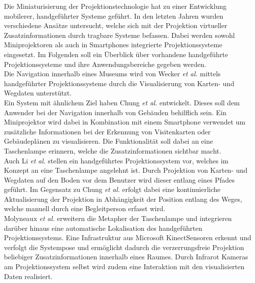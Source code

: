 Die Miniaturisierung der Projektionstechnologie hat zu einer Entwicklung mobilerer, handgeführter Systeme geführt. In den letzten Jahren wurden verschiedene Ansätze untersucht, welche sich mit der Projektion virtueller Zusatzinformationen durch tragbare Systeme befassen. Dabei werden sowohl Miniprojektoren als auch in Smartphones integrierte Projektionssysteme eingesetzt. Im Folgenden soll ein Überblick über vorhandene handgeführte Projektionssysteme und ihre Anwendungsbereiche gegeben werden.\\

Die Navigation innerhalb eines Museums wird von Wecker \textit{et al.} \cite{Wecker2013} mittels handgeführter Projektionssysteme durch die Visualisierung von Karten- und Wegdaten unterstützt.\\
Ein System mit ähnlichem Ziel haben Chung \textit{et al.} \cite{Chung2011} entwickelt. Dieses soll dem Anwender bei der Navigation innerhalb von Gebäuden behilflich sein. Ein Miniprojektor wird dabei in Kombination mit einem Smartphone verwendet um zusätzliche Informationen bei der Erkennung von Visitenkarten oder Gebäudeplänen zu visualisieren. Die Funktionalität soll dabei an eine Taschenlampe erinnern, welche die Zusatzinformationen sichtbar macht.\\
Auch Li \textit{et al.} \cite{Li2013} stellen ein handgeführtes Projektionssystem vor, welches im Konzept an eine Taschenlampe angelehnt ist. Durch Projektion von Karten- und Wegdaten auf den Boden vor dem Benutzer wird dieser entlang eines Pfades geführt. Im Gegensatz zu Chung \textit{et al.} erfolgt dabei eine kontinuierliche Aktualisierung der Projektion in Abhängigkeit der Position entlang des Weges, welche manuell durch eine Begleitperson erfasst wird.\\
Molyneaux \textit{et al.} \cite{Molyneaux2012} erweitern die Metapher der Taschenlampe und integrieren darüber hinaus eine automatische Lokalisation des handgeführten Projektionssystems. Eine Infrastruktur aus Microsoft Kinect\red[TM] Sensoren erkennt und verfolgt die Systempose und ermöglicht dadurch die verzerrungsfreie Projektion beliebiger Zusatzinformationen innerhalb eines Raumes. Durch Infrarot Kameras am Projektionssystem selbst wird zudem eine Interaktion mit den visualisierten Daten realisiert.\\

